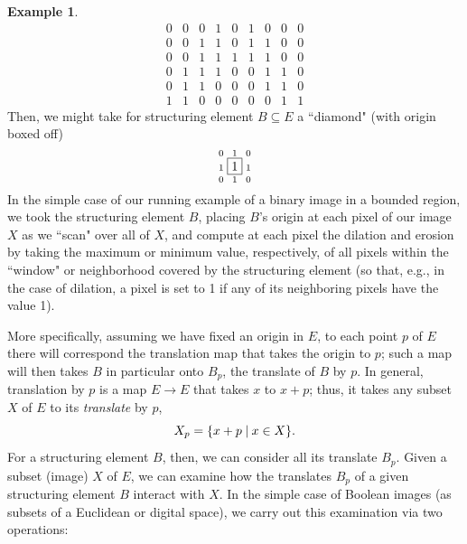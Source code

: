 \documentclass[11pt]{book}
\theoremstyle{definition}
\newtheorem{example}{Example}[section]
\theoremstyle{definition}
\theoremstyle{definition}
\theoremstyle{theorem}
\theoremstyle{definition}
\begin{document}
\begin{example}
\begin{equation*}
\begin{smallmatrix}
	0 & 0 & 0 & 1 & 0 & 1 & 0 & 0 & 0\\ 
	0 & 0 & 1 & 1 & 0 & 1 & 1 & 0 & 0 \\
	0 & 0 & 1 & 1 & 1 & 1 & 1 & 0 & 0\\
	0 & 1 & 1 & 1 & 0 & 0 & 1 & 1 & 0\\ 
	0 & 1 & 1 & 0 & 0 & 0 & 1 & 1 & 0\\ 
	1 & 1 & 0 & 0 & 0 & 0 & 0 & 1 & 1 
	\end{smallmatrix}
	\end{equation*} 
	Then, we might take for structuring element $B \subseteq  E$ a ``diamond" (with origin boxed off)
	\begin{equation*} 
	\begin{smallmatrix}
	0 & 1 & 0 \\ 
	1 & \fbox{1} & 1 \\ 
	0 & 1 & 0
	\end{smallmatrix} 
	\end{equation*}
	In the simple case of our running example of a binary image in a bounded region, we took the structuring element $B$, placing $B$'s origin at each pixel of our image $X$ as we ``scan" over all of $X$, and compute at each pixel the dilation and erosion by taking the maximum or minimum value, respectively, of all pixels within the ``window" or neighborhood covered by the structuring element (so that, e.g., in the case of dilation, a pixel is set to 1 if any of its neighboring pixels have the value 1). \par  
	More specifically, assuming we have fixed an origin in $E$, to each point $p$ of $E$ there will correspond the translation map that takes the origin to $p$; such a map will then takes $B$ in particular onto $B_p$, the translate of $B$ by $p$. In general, translation by $p$ is a map $E \rightarrow E$ that takes $x$ to $x + p$; thus, it takes any subset $X$ of $E$ to its \textit{translate} by $p$, 
	\begin{equation*}
	X_p = \{x+p \hspace*{0.25em}| \hspace*{0.25em} x \in X \}. 
	\end{equation*} 
	For a structuring element $B$, then, we can consider all its translate $B_p$. Given a subset (image) $X$ of $E$, we can examine how the translates $B_p$ of a given structuring element $B$ interact with $X$. In the simple case of Boolean images (as subsets of a Euclidean or digital space), we carry out this examination via two operations: 
	\begin{equation}

\end{equation}
\end{example}
\end{document}
